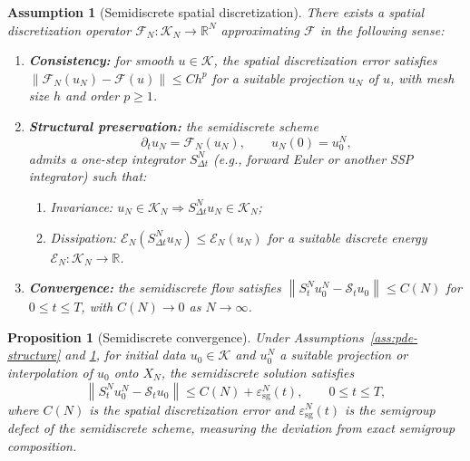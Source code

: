 \documentclass[11pt]{article}
\newtheorem{assumption}{Assumption}
\newtheorem{proposition}{Proposition}
\newcommand{\R}{\mathbb{R}}
\newcommand{\cS}{\mathcal{S}}
\newcommand{\cK}{\mathcal{K}}
\newcommand{\cE}{\mathcal{E}}
\newcommand{\cF}{\mathcal{F}}
\newcommand{\cFN}{\mathcal{F}_N}
\newcommand{\norm}[1]{\left\lVert #1 \right\rVert}
\begin{document}
\begin{assumption}[Semidiscrete spatial discretization]\label{ass:semidiscrete}
There exists a spatial discretization operator $\cFN:\cK_N\to \R^N$ approximating $\cF$ in the following sense:
\begin{enumerate}[label=(\roman*)]
    \item \textbf{Consistency:} for smooth $u\in \cK$, the spatial discretization error satisfies $\norm{\cFN(u_N)-\cF(u)}\le C h^p$ for a suitable projection $u_N$ of $u$, with mesh size $h$ and order $p\ge 1$.
    \item \textbf{Structural preservation:} the semidiscrete scheme
    \begin{equation}\label{eq:semidiscrete-scheme}
    \partial_t u_N = \cFN(u_N), \qquad u_N(0)=u_0^N,
    \end{equation}
    admits a one-step integrator $S_{\Delta t}^N$ (e.g., forward Euler or another SSP integrator) such that:
    \begin{enumerate}[label=(\alph*)]
        \item \emph{Invariance:} $u_N\in \cK_N \Longrightarrow S_{\Delta t}^N u_N\in \cK_N$;
        \item \emph{Dissipation:} $\cE_N(S_{\Delta t}^N u_N)\le \cE_N(u_N)$ for a suitable discrete energy $\cE_N:\cK_N\to \R$.
    \end{enumerate}
    \item \textbf{Convergence:} the semidiscrete flow satisfies $\norm{S_t^N u_0^N-\cS_tu_0}\le C(N)$ for $0\le t\le T$, with $C(N)\to 0$ as $N\to \infty$.
\end{enumerate}
\end{assumption}

\begin{proposition}[Semidiscrete convergence]\label{prop:semidiscrete-conv}
Under Assumptions~\ref{ass:pde-structure} and \ref{ass:semidiscrete}, for initial data $u_0\in \cK$ and $u_0^N$ a suitable projection or interpolation of $u_0$ onto $X_N$, the semidiscrete solution satisfies
\begin{equation}\label{eq:semidiscrete-conv}
\norm{S_t^N u_0^N - \cS_tu_0}\le C(N)+\varepsilon_{\mathrm{sg}}^N(t), \qquad 0\le t\le T,
\end{equation}
where $C(N)$ is the spatial discretization error and $\varepsilon_{\mathrm{sg}}^N(t)$ is the semigroup defect of the semidiscrete scheme, measuring the deviation from exact semigroup composition.
\end{proposition}
\end{document}

